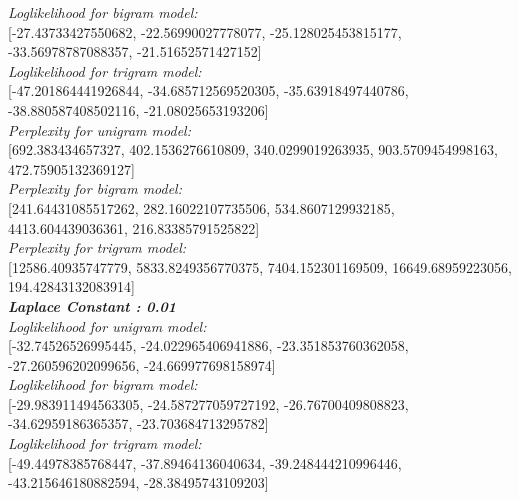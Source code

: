 \documentclass[11ppt]{article}
\begin{document}
\textit{Loglikelihood for bigram model:} \\ \vspace{1mm}  [-27.43733427550682, -22.56990027778077, -25.128025453815177, -33.56978787088357, -21.51652571427152]  \\ \vspace{2mm}
\textit{Loglikelihood for trigram model:} \\ \vspace{1mm}  [-47.201864441926844, -34.685712569520305, -35.63918497440786, -38.880587408502116, -21.08025653193206]  \\ \vspace{2mm}
\textit{Perplexity for unigram model:} \\ \vspace{1mm}  [692.383434657327, 402.1536276610809, 340.0299019263935, 903.5709454998163, 472.75905132369127]  \\ \vspace{2mm}
\textit{Perplexity for bigram model:} \\ \vspace{1mm}  [241.64431085517262, 282.16022107735506, 534.8607129932185, 4413.604439036361, 216.83385791525822]  \\ \vspace{2mm}
\textit{Perplexity for trigram model:} \\ \vspace{1mm}  [12586.40935747779, 5833.8249356770375, 7404.152301169509, 16649.68959223056, 194.42843132083914]  \\ \vspace{2mm}
\textit{\textbf{Laplace Constant : 0.01 }}\\ \vspace{2mm}
\textit{Loglikelihood for unigram model:} \\ \vspace{1mm}  [-32.74526526995445, -24.022965406941886, -23.351853760362058, -27.260596202099656, -24.669977698158974]  \\ \vspace{2mm}
\textit{Loglikelihood for bigram model:} \\ \vspace{1mm}  [-29.983911494563305, -24.587277059727192, -26.76700409808823, -34.62959186365357, -23.703684713295782]  \\ \vspace{2mm}
\textit{Loglikelihood for trigram model:} \\ \vspace{1mm}  [-49.44978385768447, -37.89464136040634, -39.248444210996446, -43.215646180882594, -28.38495743109203]  \\ \vspace{2mm}
\end{document}
